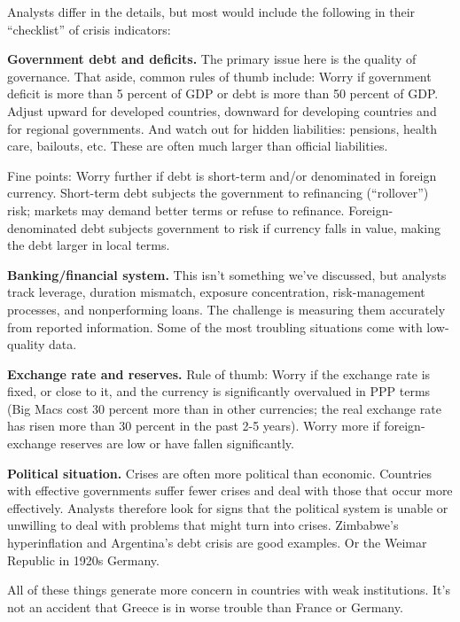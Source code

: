 Analysts differ in the details, but most would include
the following in their ``checklist'' of crisis indicators:

\textbf{Government debt and deficits.}
The primary issue here is the quality of governance.
That aside, common rules of thumb include:
Worry if government
deficit is more than 5 percent of GDP or debt is more than 50 percent of GDP.
Adjust upward for developed countries, downward for developing countries
and for regional governments.
And watch out for hidden liabilities:  pensions, health care, bailouts, etc.
These are often much larger than official liabilities.

Fine points:  Worry further if debt is short-term and/or denominated in foreign currency.
Short-term debt subjects the government to refinancing (``rollover'') risk;
markets may demand better terms or refuse to refinance.
Foreign-denominated debt subjects government to risk
if currency falls in value, making the debt larger in local terms.

\textbf{Banking/financial system.}
This isn't something we've discussed,
but  analysts track leverage, duration mismatch, exposure concentration,
risk-management processes,
and nonperforming loans.
The challenge is measuring them accurately from reported information.
Some of the most troubling situations come with low-quality data.


\textbf{Exchange rate and reserves.}
Rule of thumb:  Worry if the exchange rate is fixed, or close to it,
and the currency is significantly overvalued in PPP terms
(Big Macs cost 30 percent more than in other currencies;
the real exchange rate has risen more than 30 percent in the past 2-5 years).
Worry more if foreign-exchange reserves
are low or have fallen significantly.

\textbf{Political situation.}
Crises are often more political than economic.
Countries with effective governments suffer fewer crises and
deal with those that occur more effectively.
Analysts therefore look for signs that the political
system is unable or unwilling to deal with problems that might turn into crises.
Zimbabwe's hyperinflation and Argentina's debt crisis are good examples.
Or the Weimar Republic in 1920s Germany.

All of these things generate more concern
in countries with weak institutions.
It's not an accident that Greece is in worse trouble
than France or Germany.


